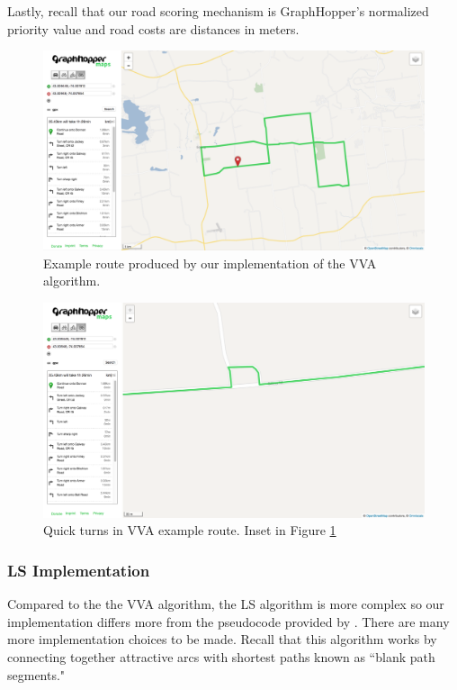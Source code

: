 \documentclass[11pt]{article}
\begin{document}
Lastly, recall that our road scoring mechanism is GraphHopper's normalized priority value and road costs are distances in meters.

\begin{figure}
    \begin{center}
        \includegraphics[width=\textwidth]{figs/vva-route}
    \end{center}
    \caption{Example route produced by our implementation of the VVA algorithm.}
    \label{fig:vva-example}
\end{figure}

\begin{figure}
    \begin{center}
        \includegraphics[width=\textwidth]{figs/vva-route-turn}
    \end{center}
    \caption{Quick turns in VVA example route. Inset in Figure \ref{fig:vva-example}}
    \label{fig:vva-example-turn}
\end{figure}


\subsubsection{LS Implementation}
Compared to the the VVA algorithm, the LS algorithm is more complex so our implementation differs more from the pseudocode provided by \citeauthor{lu2015arc}. There are many more implementation choices to be made. Recall that this algorithm works by connecting together attractive arcs with shortest paths known as ``blank path segments." 
\end{document}
